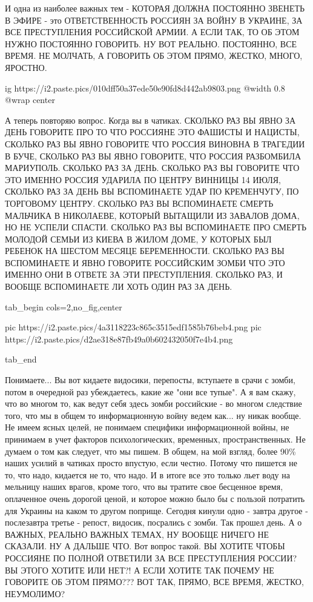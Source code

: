 И одна из наиболее важных тем - КОТОРАЯ ДОЛЖНА ПОСТОЯННО ЗВЕНЕТЬ В ЭФИРЕ - это
ОТВЕТСТВЕННОСТЬ РОССИЯН ЗА ВОЙНУ В УКРАИНЕ, ЗА ВСЕ ПРЕСТУПЛЕНИЯ РОССИЙСКОЙ
АРМИИ. А ЕСЛИ ТАК, ТО ОБ ЭТОМ НУЖНО ПОСТОЯННО ГОВОРИТЬ. НУ ВОТ РЕАЛЬНО.
ПОСТОЯННО, ВСЕ ВРЕМЯ. НЕ МОЛЧАТЬ, А ГОВОРИТЬ ОБ ЭТОМ ПРЯМО, ЖЕСТКО, МНОГО,
ЯРОСТНО.

\ifcmt
  ig https://i2.paste.pics/010dff50a37ede50e90fd8d442ab9803.png
  @width 0.8
  @wrap center
\fi

А теперь повторяю вопрос. Когда вы в чатиках. СКОЛЬКО РАЗ ВЫ ЯВНО ЗА ДЕНЬ
ГОВОРИТЕ ПРО ТО ЧТО РОССИЯНЕ ЭТО ФАШИСТЫ И НАЦИСТЫ, СКОЛЬКО РАЗ ВЫ ЯВНО
ГОВОРИТЕ ЧТО РОССИЯ ВИНОВНА В ТРАГЕДИИ В БУЧЕ, СКОЛЬКО РАЗ ВЫ ЯВНО ГОВОРИТЕ,
ЧТО РОССИЯ РАЗБОМБИЛА МАРИУПОЛЬ. СКОЛЬКО РАЗ ЗА ДЕНЬ. СКОЛЬКО РАЗ ВЫ ГОВОРИТЕ
ЧТО ЭТО ИМЕННО РОССИЯ УДАРИЛА ПО ЦЕНТРУ ВИННИЦЫ 14 ИЮЛЯ, СКОЛЬКО РАЗ ЗА ДЕНЬ ВЫ
ВСПОМИНАЕТЕ УДАР ПО КРЕМЕНЧУГУ, ПО ТОРГОВОМУ ЦЕНТРУ. СКОЛЬКО РАЗ ВЫ ВСПОМИНАЕТЕ
СМЕРТЬ МАЛЬЧИКА В НИКОЛАЕВЕ, КОТОРЫЙ ВЫТАЩИЛИ ИЗ ЗАВАЛОВ ДОМА, НО НЕ УСПЕЛИ
СПАСТИ. СКОЛЬКО РАЗ ВЫ ВСПОМИНАЕТЕ ПРО СМЕРТЬ МОЛОДОЙ СЕМЬИ ИЗ КИЕВА В ЖИЛОМ
ДОМЕ, У КОТОРЫХ БЫЛ РЕБЕНОК НА ШЕСТОМ МЕСЯЦЕ БЕРЕМЕННОСТИ. СКОЛЬКО РАЗ ВЫ
ВСПОМИНАЕТЕ И ЯВНО ГОВОРИТЕ РОССИЙСКИМ ЗОМБИ ЧТО ЭТО ИМЕННО ОНИ В ОТВЕТЕ ЗА ЭТИ
ПРЕСТУПЛЕНИЯ. СКОЛЬКО РАЗ, И ВООБЩЕ ВСПОМИНАЕТЕ ЛИ ХОТЬ ОДИН РАЗ ЗА ДЕНЬ.

\ifcmt
  tab_begin cols=2,no_fig,center

     pic https://i2.paste.pics/4a3118223c865c3515edf1585b76beb4.png
     pic https://i2.paste.pics/d2ae318e87fb49a0b602432050f7e4b4.png

  tab_end
\fi

Понимаете... Вы вот кидаете видосики, перепосты, вступаете в срачи с зомби,
потом в очередной раз убеждаетесь, какие же "они все тупые". А я вам скажу, что
во многом то, как ведут себя здесь зомби российские - во многом следствие того,
что мы в общем то информационную войну ведем как... ну никак вообще. Не имеем
ясных целей, не понимаем специфики информационной войны, не принимаем в учет
факторов психологических, временных, пространственных. Не думаем о том как
следует, что мы пишем. В общем, на мой взгляд, более 90\% наших усилий в чатиках
просто впустую, если честно. Потому что пишется не то, что надо, кидается не
то, что надо. И в итоге все это только льет воду на мельницу наших врагов,
кроме того, что вы тратите свое бесценное время, оплаченное очень дорогой
ценой, и которое можно было бы с пользой потратить для Украины на каком то
другом поприще.  Сегодня кинули одно - завтра другое - послезавтра третье -
репост, видосик, посрались с зомби. Так прошел день. А о ВАЖНЫХ, РЕАЛЬНО ВАЖНЫХ
ТЕМАХ, НУ ВООБЩЕ НИЧЕГО НЕ СКАЗАЛИ. НУ А ДАЛЬШЕ ЧТО. Вот вопрос такой. ВЫ
ХОТИТЕ ЧТОБЫ РОССИЯНЕ ПО ПОЛНОЙ ОТВЕТИЛИ ЗА ВСЕ ПРЕСТУПЛЕНИЯ РОССИИ? ВЫ ЭТОГО
ХОТИТЕ ИЛИ НЕТ?! А ЕСЛИ ХОТИТЕ ТАК ПОЧЕМУ НЕ ГОВОРИТЕ ОБ ЭТОМ ПРЯМО??? ВОТ ТАК,
ПРЯМО, ВСЕ ВРЕМЯ, ЖЕСТКО, НЕУМОЛИМО?
